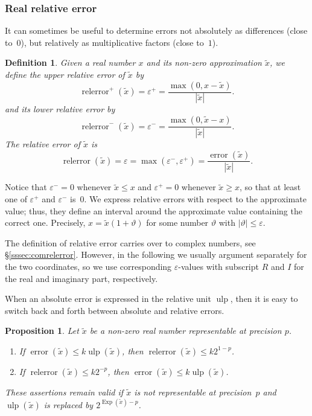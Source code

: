 \documentclass [11pt]{article}
\newcommand {\corr}[1]{{#1}}
\newcommand {\appro}[1]{\widetilde {#1}}
\newcommand {\Ulp}{{\operatorname {ulp}}}
\DeclareMathOperator{\Exp}{\operatorname {Exp}}
\newcommand{\error}{\operatorname {error}}
\newcommand{\relerror}{\operatorname {relerror}}
\renewcommand {\epsilon}{\varepsilon}
\renewcommand {\theta}{\vartheta}
\renewcommand {\leq}{\leqslant}
\renewcommand {\geq}{\geqslant}
\newtheorem{definition}[theorem]{Definition}
\newtheorem{prop}[theorem]{Proposition}
\begin{document}
\subsubsection {Real relative error}

It can sometimes be useful to determine errors not absolutely as differences
(close to~$0$),
but relatively as multiplicative factors (close to~$1$).

\begin {definition}
\label {def:relerror}
Given a real number $\corr x$ and its non-zero approximation $\appro x$,
we define the {\em upper relative error} of $\appro x$ by
\[
\relerror^+ (\appro x) = \epsilon^+
= \frac {\max (0, \corr x - \appro x)}{|\appro x|}.
\]
and its {\em lower relative error} by
\[
\relerror^- (\appro x) = \epsilon^-
= \frac {\max (0, \appro x - \corr x)}{|\appro x|}.
\]
The {\em relative error} of $\appro x$ is
\[
\relerror (\appro x) = \epsilon = \max (\epsilon^-, \epsilon^+)
= \frac {\error (\appro x)}{|\appro x|}.
\]
\end {definition}

Notice that $\epsilon^- = 0$ whenever $\appro x \leq \corr x$ and
$\epsilon^+ = 0$ whenever $\appro x \geq \corr x$, so that at least one of
$\epsilon^+$ and $\epsilon^-$ is~$0$. We express relative errors with
respect to the approximate value; thus, they define an interval around
the approximate value containing the correct one. Precisely,
$\corr x = \appro x (1 + \vartheta)$ for some number $\theta$ with
$|\theta| \leq \epsilon$.

The definition of relative error carries over to complex numbers,
see \S\ref {sssec:comrelerror}.
However, in the following we usually argument separately for the two coordinates,
so we use corresponding $\epsilon$-values with subscript $R$ and $I$ for the
real and imaginary part, respectively.

When an absolute error is expressed in the relative unit $\Ulp$, then
it is easy to switch back and forth between absolute and relative errors.

\begin {prop}
\label {prop:relerror}
Let $\appro x$ be a non-zero real number representable at precision $p$.
\begin {enumerate}
\item
If $\error (\appro x) \leq k \Ulp (\appro x)$,
then $\relerror (\appro x) \leq k 2^{1 - p}$.
\item
If $\relerror (\appro x) \leq k 2^{-p}$,
then $\error (\appro x) \leq k \Ulp (\appro x)$.
\end {enumerate}
These assertions remain valid if $\appro x$ is not representable at
precision~$p$ and $\Ulp (\appro x)$ is replaced by $2^{\Exp (\appro x) - p}$.
\end {prop}
\end{document}
